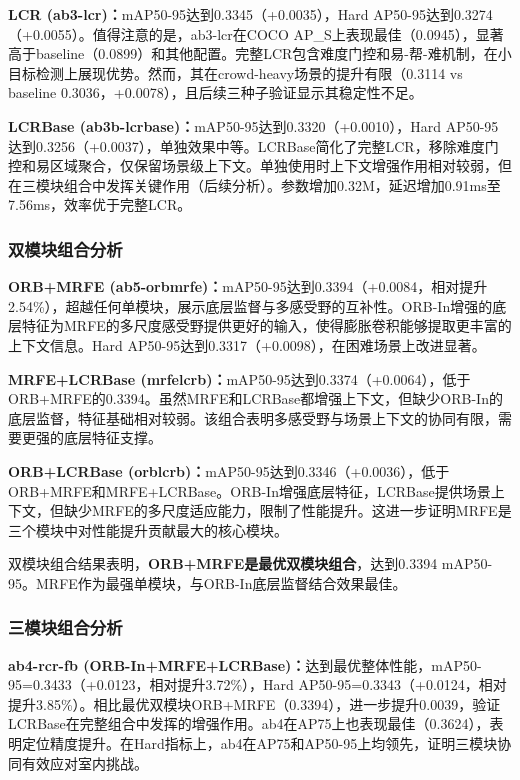 \documentclass[journal]{IEEEtran}
\begin{document}
\textbf{LCR (ab3-lcr)：}mAP50-95达到0.3345（+0.0035），Hard AP50-95达到0.3274（+0.0055）。值得注意的是，ab3-lcr在COCO AP\_S上表现最佳（0.0945），显著高于baseline（0.0899）和其他配置。完整LCR包含难度门控和易-帮-难机制，在小目标检测上展现优势。然而，其在crowd-heavy场景的提升有限（0.3114 vs baseline 0.3036，+0.0078），且后续三种子验证显示其稳定性不足。

\textbf{LCRBase (ab3b-lcrbase)：}mAP50-95达到0.3320（+0.0010），Hard AP50-95达到0.3256（+0.0037），单独效果中等。LCRBase简化了完整LCR，移除难度门控和易区域聚合，仅保留场景级上下文。单独使用时上下文增强作用相对较弱，但在三模块组合中发挥关键作用（后续分析）。参数增加0.32M，延迟增加0.91ms至7.56ms，效率优于完整LCR。

\subsubsection{双模块组合分析}

\textbf{ORB+MRFE (ab5-orbmrfe)：}mAP50-95达到0.3394（+0.0084，相对提升2.54\%），超越任何单模块，展示底层监督与多感受野的互补性。ORB-In增强的底层特征为MRFE的多尺度感受野提供更好的输入，使得膨胀卷积能够提取更丰富的上下文信息。Hard AP50-95达到0.3317（+0.0098），在困难场景上改进显著。

\textbf{MRFE+LCRBase (mrfelcrb)：}mAP50-95达到0.3374（+0.0064），低于ORB+MRFE的0.3394。虽然MRFE和LCRBase都增强上下文，但缺少ORB-In的底层监督，特征基础相对较弱。该组合表明多感受野与场景上下文的协同有限，需要更强的底层特征支撑。

\textbf{ORB+LCRBase (orblcrb)：}mAP50-95达到0.3346（+0.0036），低于ORB+MRFE和MRFE+LCRBase。ORB-In增强底层特征，LCRBase提供场景上下文，但缺少MRFE的多尺度适应能力，限制了性能提升。这进一步证明MRFE是三个模块中对性能提升贡献最大的核心模块。

双模块组合结果表明，\textbf{ORB+MRFE是最优双模块组合}，达到0.3394 mAP50-95。MRFE作为最强单模块，与ORB-In底层监督结合效果最佳。

\subsubsection{三模块组合分析}

\textbf{ab4-rcr-fb (ORB-In+MRFE+LCRBase)：}达到最优整体性能，mAP50-95=0.3433（+0.0123，相对提升3.72\%），Hard AP50-95=0.3343（+0.0124，相对提升3.85\%）。相比最优双模块ORB+MRFE（0.3394），进一步提升0.0039，验证LCRBase在完整组合中发挥的增强作用。ab4在AP75上也表现最佳（0.3624），表明定位精度提升。在Hard指标上，ab4在AP75和AP50-95上均领先，证明三模块协同有效应对室内挑战。
\end{document}
